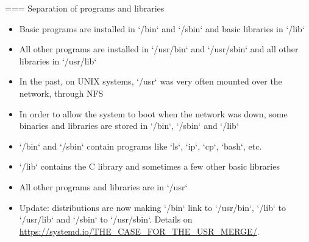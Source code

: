 === Separation of programs and libraries
  \small
  \begin{itemize}
  \item Basic programs are installed in `/bin` and `/sbin`
    and basic libraries in `/lib`
  \item All other programs are installed in `/usr/bin` and
    `/usr/sbin` and all other libraries in `/usr/lib`
  \item In the past, on UNIX systems, `/usr` was very often
    mounted over the network, through NFS
  \item In order to allow the system to boot when the network was
    down, some binaries and libraries are stored in `/bin`,
    `/sbin` and `/lib`
  \item `/bin` and `/sbin` contain programs like `ls`,
    `ip`, `cp`, `bash`, etc.
  \item `/lib` contains the C library and sometimes a few other
    basic libraries
  \item All other programs and libraries are in `/usr`
  \item Update: distributions are now making `/bin` link to
    `/usr/bin`, `/lib` to `/usr/lib` and `/sbin`
    to `/usr/sbin`. Details on
    \url{https://systemd.io/THE_CASE_FOR_THE_USR_MERGE/}.
  \end{itemize}

